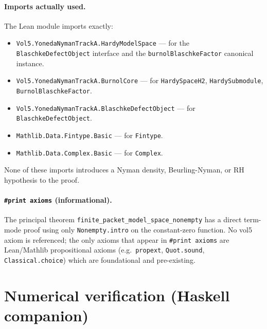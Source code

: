 \documentclass[11pt]{article}
\theoremstyle{plain}
\theoremstyle{definition}
\theoremstyle{remark}
\newcommand{\code}[1]{\texttt{#1}}
\begin{document}
\paragraph{Imports actually used.}
The Lean module imports exactly:
\begin{itemize}
  \item \code{Vol5.YonedaNymanTrackA.HardyModelSpace}
        --- for the \code{BlaschkeDefectObject} interface and the
        \code{burnolBlaschkeFactor} canonical instance.
  \item \code{Vol5.YonedaNymanTrackA.BurnolCore}
        --- for \code{HardySpaceH2}, \code{HardySubmodule},
        \code{BurnolBlaschkeFactor}.
  \item \code{Vol5.YonedaNymanTrackA.BlaschkeDefectObject}
        --- for \code{BlaschkeDefectObject}.
  \item \code{Mathlib.Data.Fintype.Basic} --- for \code{Fintype}.
  \item \code{Mathlib.Data.Complex.Basic} --- for \code{Complex}.
\end{itemize}
None of these imports introduces a Nyman density, Beurling-Nyman, or RH
hypothesis to the proof.

\paragraph{\code{\#print axioms} (informational).}
The principal theorem \code{finite\_packet\_model\_space\_nonempty} has a
direct term-mode proof using only \code{Nonempty.intro} on the
constant-zero function.  No vol5 axiom is referenced; the only axioms
that appear in \code{\#print axioms} are Lean/Mathlib propositional
axioms (e.g.\ \code{propext}, \code{Quot.sound}, \code{Classical.choice})
which are foundational and pre-existing.

\section{Numerical verification (Haskell companion)}\label{sec:haskell}
\end{document}
